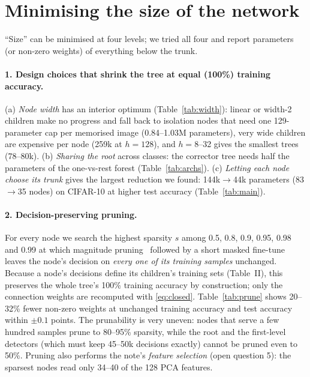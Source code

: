 \section{Minimising the size of the network}
\label{sec:min}

``Size'' can be minimised at four levels; we tried all four and report parameters (or non-zero
weights) of everything below the trunk.

\paragraph{1. Design choices that shrink the tree at equal (100\%) training accuracy.}
(a) \emph{Node width} has an interior optimum (Table~\ref{tab:width}): linear or width-2 children
make no progress and fall back to isolation nodes that need one 129-parameter cap per memorised
image (0.84--1.03M parameters), very wide children are expensive per node (259k at $h=128$), and
$h=8$--32 gives the smallest trees (78--80k). (b) \emph{Sharing the root} across classes: the corrector
tree needs half the parameters of the one-vs-rest forest (Table~\ref{tab:archs}). (c) \emph{Letting
each node choose its trunk} gives the largest reduction we found: 144k$\to$44k parameters
(83$\to$35 nodes) on CIFAR-10 at higher test accuracy (Table~\ref{tab:main}).

\paragraph{2. Decision-preserving pruning.} For every node we search the highest sparsity
$s$ among 0.5, 0.8, 0.9, 0.95, 0.98 and 0.99 at which magnitude pruning~\cite{lottery} followed by a short masked
fine-tune leaves the node's decision on \emph{every one of its training samples} unchanged.
Because a node's decisions define its children's training sets (Table~II), this preserves the whole
tree's 100\% training accuracy by construction; only the connection weights are recomputed with
\eqref{eq:closed}. Table~\ref{tab:prune} shows 20--32\% fewer non-zero weights at unchanged training
accuracy and test accuracy within $\pm0.1$ points. The prunability is very uneven: nodes that serve a
few hundred samples prune to 80--95\% sparsity, while the root and the first-level detectors (which
must keep 45--50k decisions exactly) cannot be pruned even to 50\%. Pruning also performs the note's
\emph{feature selection} (open question 5): the sparsest nodes read only 34--40 of the 128 PCA features.


